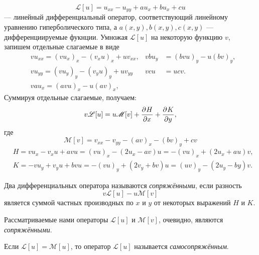 \begin{equation}
	\mathscr{L}[u] = u_{xx} - u_{yy}  + a u_x + b u_x + c u
	\label{equ:equDivOp}
\end{equation}
--- линейный дифференциальный оператор, соответствующий линейному уравнению гиперболического типа, а $a(x, y), b(x, y), c(x, y)$ --- дифференциируемые фукнции. Умножая $\mathscr{L}[u]$ на некоторую функцию $v$, запишем отдельные слагаемые в виде
\begin{align*}
	&v u_{xx} = (v u_x)_x - (v_x u)_x + u v_{xx}, &v b u_y &= (b v u)_y - u (bv)_y,\\
	&v u_{yy} = (v u_y)_y - (v_y u)_y + u v_{yy} &v c u &= u c v.\\
	&v au_x = (a v u)_x - u(a v)_x,
\end{align*}
Суммируя отдельные слагаемые, получаем:
\begin{equation}
	v \mathscr{L}[u] = u \mathscr{M}[v] + \frac{\partial^{}H}{\partial x^{}} + \frac{\partial^{}K}{\partial y^{}},
	\label{equ:equDivOp}
\end{equation}
где 
\[
	\mathscr{M}[v] = v_{xx} - v_{yy} - (a v)_x - (b v)_y + c v
\]
\begin{align*}
	&H = v u_x - v_x u + av u = (v u)_x - (2 u_x - a v) u = - (v u)_x + (2u_x + a u)v,\\
	&K= - v u_y + v_y u + b v u = -(v u)_y + (2v_y + b v) u = (u v)_y - (2 u_y - b y)v.
\end{align*}

Два дифференциальных оператора называются \textit{сопряжёнными}, если разность 
\[
	v \mathscr{L}[u] - u \mathscr{M}[v]
\]
является суммой частных производных по $x$ и $y$ от некоторых выражений $H$ и $K$. 

Рассматриваемые нами операторы $\mathscr{L}[u]$ и $\mathscr{M}[v]$, очевидно, являются \textit{сопряжёнными}.

Если $\mathscr{L}[u] = \mathscr{M}[u]$, то оператор $\mathscr{L}[u]$ называется \textit{самосопряжённым}.
